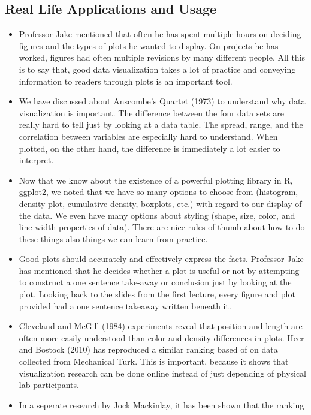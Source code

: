 \subsection{Real Life Applications and Usage}
\begin{itemize}
    \item Professor Jake mentioned that often he has spent multiple hours on deciding
    figures and the types of plots he wanted to display. On projects he has worked,
    figures had often multiple revisions by many different people. All this is to say
    that, good data visualization takes a lot of practice and conveying information to
    readers through plots is an important tool.
    \item We have discussed about Anscombe's Quartet (1973) to understand why data
    visualization is important. The difference between the four data sets are really hard
    to tell just by looking at a data table. The spread, range, and the correlation
    between variables are especially hard to understand. When plotted, on the other hand,
    the difference is immediately a lot easier to interpret. 
    \item Now that we know about the existence of a powerful plotting library in R,
    ggplot2, we noted that we have so many options to choose from (histogram, density
    plot, cumulative density, boxplots, etc.) with regard to our display of the data. We
    even have many options about styling (shape, size, color, and line width properties of
    data). There are nice rules of thumb about how to do these things also things we can
    learn from practice.
    \item Good plots should accurately and effectively express the facts. Professor Jake
    has mentioned that he decides whether a plot is useful or not by attempting to
    construct a one sentence take-away or conclusion just by looking at the plot. Looking
    back to the slides from the first lecture, every figure and plot provided had a one
    sentence takeaway written beneath it.
    \item Cleveland and McGill (1984) experiments reveal that position and length are
    often more easily understood than color and density differences in plots.  Heer and
    Bostock (2010) has reproduced a similar ranking based of on data collected from
    Mechanical Turk. This is important, because it shows that visualization research can
    be done online instead of just depending of physical lab participants.
    \item In a seperate research by Jock Mackinlay, it has been shown that the ranking

\end{itemize}
